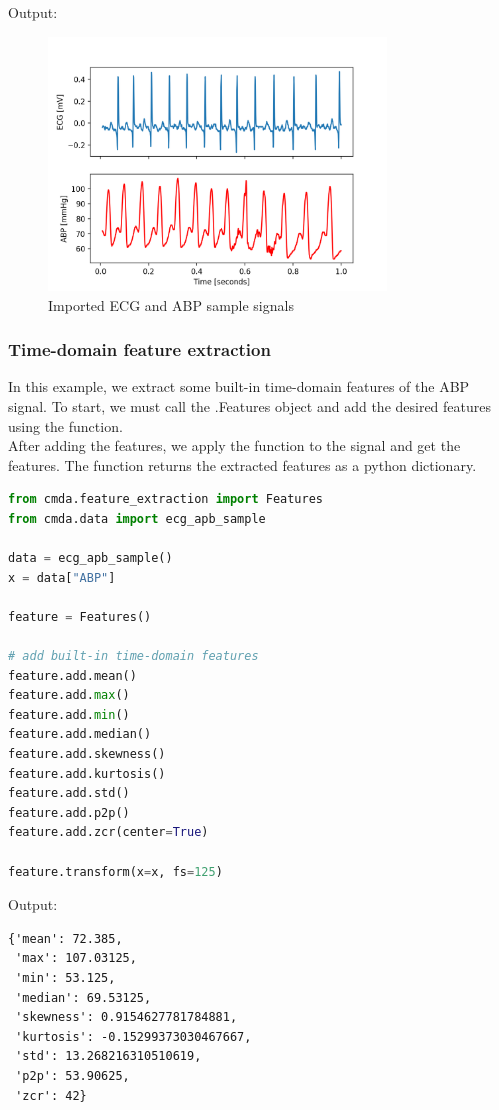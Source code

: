 \documentclass{article}
\begin{document}
Output:
\begin{figure}[h]
\includegraphics[width=0.8\textwidth]{ecg_abp_sample.png}
\centering
\caption{Imported ECG and ABP sample signals}
\label{fig:pipeline}
\end{figure}

\subsubsection{Time-domain feature extraction}
In this example, we extract some built-in time-domain features of the ABP signal. To start, we must call the .Features object and add the desired features using the  function.\\
After adding the features, we apply the  function to the signal and get the features. The  function returns the extracted features as a python dictionary.

\begin{lstlisting}[language=Python, caption=Time-domain feature extraction]
from cmda.feature_extraction import Features
from cmda.data import ecg_apb_sample

data = ecg_apb_sample()
x = data["ABP"]

feature = Features()

# add built-in time-domain features
feature.add.mean()
feature.add.max()
feature.add.min()
feature.add.median()
feature.add.skewness()
feature.add.kurtosis()
feature.add.std()
feature.add.p2p()
feature.add.zcr(center=True)

feature.transform(x=x, fs=125)
\end{lstlisting}

Output:
\begin{lstlisting}[caption=Time-domain feature extraction output]
{'mean': 72.385,
 'max': 107.03125,
 'min': 53.125,
 'median': 69.53125,
 'skewness': 0.9154627781784881,
 'kurtosis': -0.15299373030467667,
 'std': 13.268216310510619,
 'p2p': 53.90625,
 'zcr': 42}
\end{lstlisting}
\end{document}
